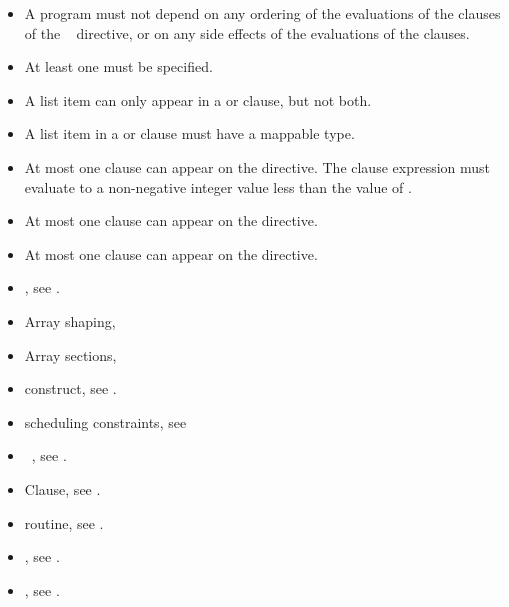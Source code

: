 \restrictions
\begin{itemize}
\item A program must not depend on any ordering of the evaluations of the clauses of the
~ directive, or on any side effects of the evaluations of the clauses.

\item At least one  must be specified.

\item A list item can only appear in a  or  clause, but not both.

\item A list item in a  or  clause must have a mappable type.

\item At most one  clause can appear on the directive. The
     clause expression
      must evaluate to a non-negative integer value less than the value
      of .

\item At most one  clause can appear on the directive.

\item At most one  clause can appear on the directive.
\end{itemize}

\crossreferences
\begin{itemize}
\item {}, see
.

\item Array shaping,

\item Array sections,

\item {} construct, see
.

\item {} scheduling constraints, see

\item {}~, see
.

\item {} Clause, see .

\item {} routine, see .

\item {}, see
.

\item {}, see
.


\end{itemize}










